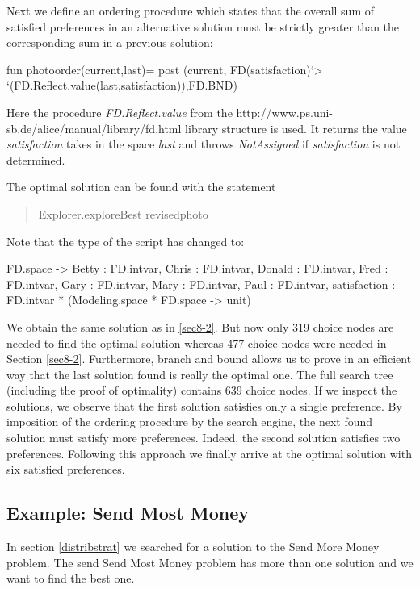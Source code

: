 \documentclass[a4paper,halfparskip]{scrartcl}
\begin{document}
Next we define an ordering procedure which states that the overall 
sum of satisfied preferences in an alternative solution must be 
strictly greater than the corresponding sum in a previous solution:

\begin{myverbatim}
fun photoorder(current,last)=
               post (current, FD(satisfaction)`> 
            `(FD.Reflect.value(last,satisfaction)),FD.BND)
\end{myverbatim}


Here the procedure \emph{FD.Reflect.value} from the
\htmladdnormallink{\textcolor{blue}{FD.Reflect}}
{http://www.ps.uni-sb.de/alice/manual/library/fd.html}
library structure is used.
It returns the value \emph{satisfaction} takes in the space \emph{last} and
throws \emph{NotAssigned} if \emph{satisfaction} is not determined.

The optimal solution can be found with the statement
\begin{quote}
    Explorer.exploreBest revisedphoto
\end{quote}
Note that the type of the script has changed to:
\begin{myverbatim}
FD.space ->
      {Betty : FD.intvar, Chris : FD.intvar, Donald : FD.intvar,
       Fred : FD.intvar, Gary : FD.intvar, Mary : FD.intvar, Paul : FD.intvar,
       satisfaction : FD.intvar} * (Modeling.space * FD.space -> unit)
\end{myverbatim}


We obtain the same solution as in \ref{sec8-2}. But now only 319 choice nodes 
are needed to find the optimal solution whereas 477 choice nodes 
were needed in Section \ref{sec8-2}. Furthermore, branch and bound allows 
us to prove in an efficient way that the last solution found is 
really the optimal one. The full search tree (including the proof 
of optimality) contains 639 choice nodes. If we inspect 
the solutions, we observe that the first solution satisfies only a 
single preference. By imposition of the ordering procedure by the 
search engine, the next found solution must satisfy more preferences. 
Indeed, the second solution satisfies two preferences. Following 
this approach we finally arrive at the optimal solution with six 
satisfied preferences.


\newpage
\subsection{Example: Send Most Money}
In section \ref{distribstrat} we searched for a solution to the
Send More Money problem. The send Send Most Money problem
has more than one solution and we want to find the best one.
\end{document}
